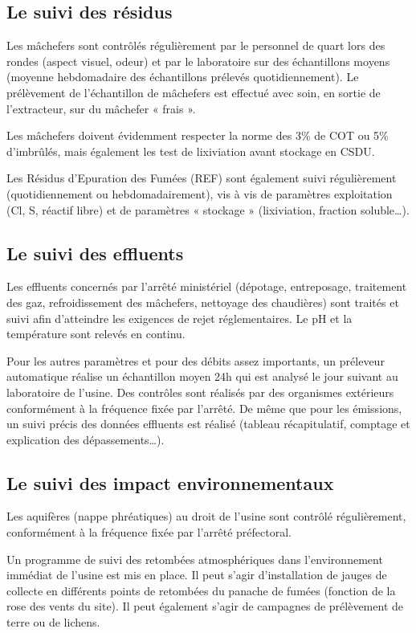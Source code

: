 
\subsection{Le suivi des résidus}

Les mâchefers sont contrôlés régulièrement par le personnel de quart lors des rondes (aspect visuel, odeur) et par le laboratoire sur des échantillons moyens (moyenne hebdomadaire des échantillons prélevés quotidiennement).
Le prélèvement de l’échantillon de mâchefers est effectué avec soin, en sortie de l’extracteur, sur du mâchefer « frais ».
\vspace{0.3cm}

Les mâchefers doivent évidemment respecter la norme des 3\% de COT ou 5\% d’imbrûlés, mais également les test de lixiviation avant stockage en CSDU.
\vspace{0.3cm}

Les Résidus d’Epuration des Fumées (REF) sont également suivi régulièrement (quotidiennement ou hebdomadairement), vis à vis de paramètres exploitation (Cl, S, réactif libre) et de paramètres « stockage » (lixiviation, fraction soluble…).



\subsection{Le suivi des effluents}

Les effluents concernés par l’arrêté ministériel (dépotage, entreposage, traitement des gaz, refroidissement des mâchefers, nettoyage des chaudières) sont traités et suivi afin d’atteindre les exigences de rejet réglementaires.
Le pH et la température sont relevés en continu.

\vspace{0.3cm}

Pour les autres paramètres et pour des débits assez importants, un préleveur automatique réalise un échantillon moyen 24h qui est analysé le jour suivant au laboratoire de l’usine. Des contrôles sont réalisés par des organismes extérieurs conformément à la fréquence fixée par l’arrêté.
De même que pour les émissions, un suivi précis des données effluents est réalisé (tableau récapitulatif, comptage et explication des dépassements…).



\subsection{Le suivi des impact environnementaux}

Les aquifères (nappe phréatiques) au droit de l’usine sont contrôlé régulièrement, conformément à la fréquence fixée par l’arrêté préfectoral.

\vspace{0.3cm}

Un programme de suivi des retombées atmosphériques dans l’environnement immédiat de l’usine est mis en place.
Il peut s’agir d’installation de jauges de collecte en différents points de retombées du panache de fumées (fonction de la rose des vents du site). Il peut également s’agir de campagnes de prélèvement de terre ou de lichens.


